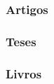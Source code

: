 \documentclass[aspectratio=169]{beamer}
\begin{document}
{%

  \begin{frame}\frametitle{Artigos}
  \end{frame}
}

{%

  \begin{frame}\frametitle{Teses}
  \end{frame}
}

{%

  \begin{frame}\frametitle{Livros}
  \end{frame}
}
\end{document}

